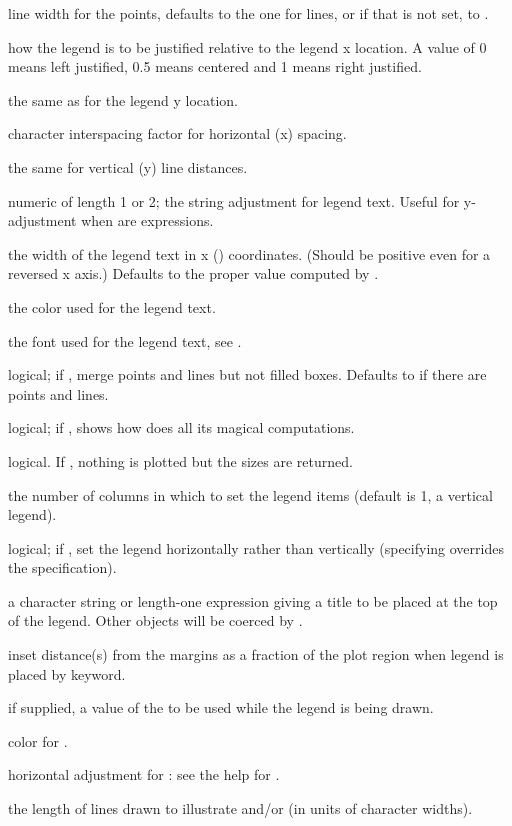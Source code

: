 \begin{Arguments}
\begin{ldescription}
\item[\code{pt.lwd}] line width for the points, defaults to the one for
lines, or if that is not set, to .
\item[\code{xjust}] how the legend is to be justified relative to the legend
x location.  A value of 0 means left justified, 0.5 means centered
and 1 means right justified.
\item[\code{yjust}] the same as  for the legend y location.
\item[\code{x.intersp}] character interspacing factor for horizontal (x) spacing.
\item[\code{y.intersp}] the same for vertical (y) line distances.
\item[\code{adj}] numeric of length 1 or 2; the string adjustment for legend
text.  Useful for y-adjustment when  are
 expressions.
\item[\code{text.width}] the width of the legend text in x ()
coordinates.  (Should be positive even for a reversed x axis.)
Defaults to the proper value computed by .
\item[\code{text.col}] the color used for the legend text.
\item[\code{text.font}] the font used for the legend text, see .
\item[\code{merge}] logical; if , merge points and lines but
not filled boxes.  Defaults to  if there are points and lines.
\item[\code{trace}] logical; if , shows how  does all
its magical computations.
\item[\code{plot}] logical.  If , nothing is plotted but the
sizes are returned.
\item[\code{ncol}] the number of columns in which to set the legend items
(default is 1, a vertical legend).
\item[\code{horiz}] logical; if , set the legend horizontally
rather than vertically (specifying  overrides the 
specification).
\item[\code{title}] a character string or length-one expression giving a
title to be placed at the top of the legend.  Other objects will be
coerced by .
\item[\code{inset}] inset distance(s) from the margins as a fraction of the
plot region when legend is placed by keyword.
\item[\code{xpd}] if supplied, a value of the  
to be used while the legend is being drawn.
\item[\code{title.col}] color for .
\item[\code{title.adj}] horizontal adjustment for : see the help
for .
\item[\code{seg.len}] the length of lines drawn to illustrate 
and/or  (in units of character widths).
\end{ldescription}
\end{Arguments}
